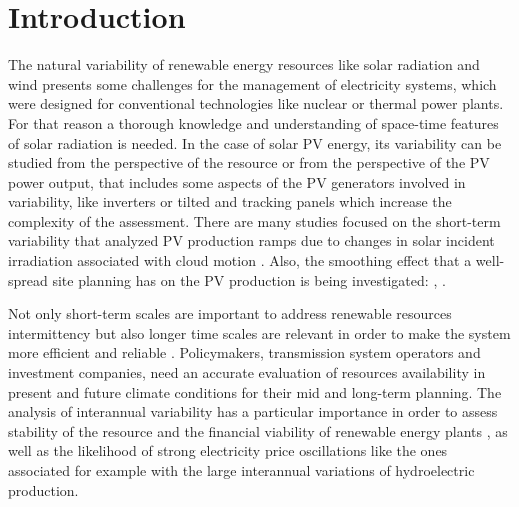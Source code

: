\section{Introduction}



The natural variability of renewable energy resources like solar radiation and wind presents some challenges for the management of electricity systems, which were designed for conventional technologies like nuclear or thermal power plants. For that reason a thorough knowledge and understanding of space-time features of solar radiation is needed. In the case of solar PV energy,  its variability \cite*{Widen2015} can be studied from the perspective of the resource or from the perspective of the PV power output, that includes some aspects of the PV generators involved in variability, like inverters or tilted and tracking panels which increase the complexity of the assessment. There are many studies focused on the short-term variability \cite*{Zamo.Mestre.ea2014} that analyzed PV production ramps due to changes in solar incident irradiation associated with cloud motion \cite*{Cros2014, IEA-PVPS-T14-1.32015}. Also, the smoothing effect that a well-spread site planning has on the PV production is being investigated: \cite*{Marcos2012}, \cite*{Perpinan.Marcos.ea2013}.

Not only short-term scales are important to address renewable resources intermittency but also longer time scales are relevant in order to make the system more efficient and reliable \cite*{Davy2012}. Policymakers, transmission system operators and investment companies, need an accurate evaluation of resources availability in present and future climate conditions for their mid and long-term planning. The analysis of interannual variability has a particular importance in order to assess stability of the resource and the financial viability of renewable energy plants \cite*{pryor2006inter}, as well as the likelihood of strong electricity price oscillations like the ones associated for example with the large interannual variations of hydroelectric production.

